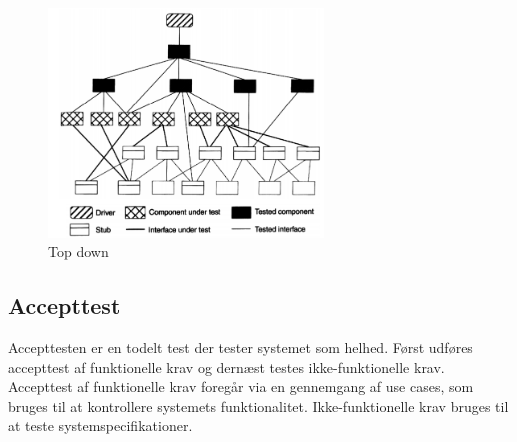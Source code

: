 \begin{figure}[H]
	\centering
	\includegraphics[width=0.65\textwidth]{Billeder/Test/top-down.png}
	\vspace{-5pt}
	\caption{Top down}
	\label{fig:Top_down}
\end{figure}

\vspace{1.5cm}

\subsection{Accepttest} 
Accepttesten er en todelt test der tester systemet som helhed. 
Først udføres accepttest af funktionelle krav og dernæst testes ikke-funktionelle krav.
Accepttest af funktionelle krav foregår via en gennemgang af use cases, som bruges til at kontrollere systemets funktionalitet. Ikke-funktionelle krav bruges til at teste systemspecifikationer.  
